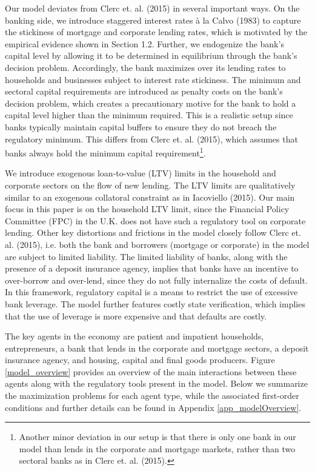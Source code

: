 \documentclass[12pt]{article}
\numberwithin{equation}{section}
\begin{document}
Our model deviates from Clerc et. al. (2015) in several important ways. On the banking side, we introduce staggered interest rates à la Calvo (1983) to capture the stickiness of mortgage and corporate lending rates, which is motivated by the empirical evidence shown in Section 1.2. Further, we endogenize the bank's capital level by allowing it to be determined in equilibrium through the bank's decision problem. Accordingly, the bank maximizes over its lending rates to households and businesses subject to interest rate stickiness. The minimum and sectoral capital requirements are introduced as penalty costs on the bank's decision problem, which creates a precautionary motive for the bank to hold a capital level higher than the minimum required. This is a realistic setup since banks typically maintain capital buffers to ensure they do not breach the regulatory minimum. This differs from Clerc et. al. (2015), which assumes that banks always hold the minimum capital requirement\footnote{Another minor deviation in our setup is that there is only one bank in our model than lends in the corporate and mortgage markets, rather than two sectoral banks as in Clerc et. al. (2015).}. 

We introduce exogenous loan-to-value (LTV) limits in the household and corporate sectors on the flow of new lending. The LTV limits are qualitatively similar to an exogenous collatoral constraint as in Iacoviello (2015). Our main focus in this paper is on the household LTV limit, since the Financial Policy Committee (FPC) in the U.K. does not have such a regulatory tool on corporate lending. Other key distortions and frictions in the model closely follow Clerc et. al. (2015), i.e. both the bank and borrowers (mortgage or corporate) in the model are subject to limited liability. The limited liability of banks, along with the presence of a deposit insurance agency, implies that banks have an incentive to over-borrow and over-lend, since they do not fully internalize the costs of default. In this framework, regulatory capital is a means to restrict the use of excessive bank leverage. The model further features costly state verification, which implies that the use of leverage is more expensive and that defaults are costly. 

The key agents in the economy are patient and impatient households, entrepreneurs, a bank that lends in the corporate and mortgage sectors, a deposit insurance agency, and housing, capital and final goods producers. Figure \ref{model_overview} provides an overview of the main interactions between these agents along with the regulatory tools present in the model. Below we summarize the maximization problems for each agent type, while the associated first-order conditions and further details can be found in Appendix \ref{app_modelOverview}.
\end{document}

